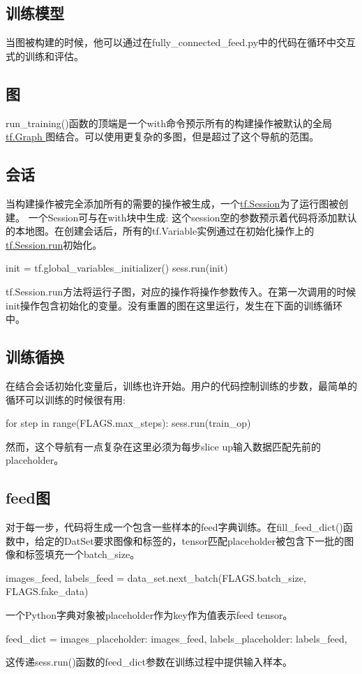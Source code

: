 \subsection{训练模型}
当图被构建的时候，他可以通过在fully\_connected\_feed.py中的代码在循环中交互式的训练和评估。
\subsection{图}
run\_training()函数的顶端是一个with命令预示所有的构建操作被默认的全局\href{https://www.tensorflow.org/api_docs/python/tf/Graph}{tf.Graph }图结合。可以使用更复杂的多图，但是超过了这个导航的范围。
\subsection{会话}
当构建操作被完全添加所有的需要的操作被生成，一个\href{https://www.tensorflow.org/api_docs/python/tf/Session}{tf.Session}为了运行图被创建。
一个Session可与在with块中生成:
这个session空的参数预示着代码将添加默认的本地图。在创建会话后，所有的tf.Variable实例通过在初始化操作上的\href{https://www.tensorflow.org/api_docs/python/tf/Session#run}{tf.Session.run}初始化。
\begin{pythoncode}
init = tf.global_variables_initializer()
sess.run(init)
\end{pythoncode}
tf.Session.run方法将运行子图，对应的操作将操作参数传入。在第一次调用的时候init操作包含初始化的变量。没有重置的图在这里运行，发生在下面的训练循环中。
\subsection{训练循换}
在结合会话初始化变量后，训练也许开始。用户的代码控制训练的步数，最简单的循环可以训练的时候很有用:
\begin{pythoncode}
for step in range(FLAGS.max_steps):
    sess.run(train_op)
\end{pythoncode}
然而，这个导航有一点复杂在这里必须为每步slice up输入数据匹配先前的placeholder。
\subsection{feed图}
对于每一步，代码将生成一个包含一些样本的feed字典训练。在fill\_feed\_dict()函数中，给定的DatSet要求图像和标签的，tensor匹配placeholder被包含下一批的图像和标签填充一个batch\_size。
\begin{pythoncode}
images_feed, labels_feed = data_set.next_batch(FLAGS.batch_size,
                                               FLAGS.fake_data)
\end{pythoncode}
一个Python字典对象被placeholder作为key作为值表示feed tensor。
\begin{pythoncode}
feed_dict = {
    images_placeholder: images_feed,
    labels_placeholder: labels_feed,
}
\end{pythoncode}
这传递sess.run()函数的feed\_dict参数在训练过程中提供输入样本。
